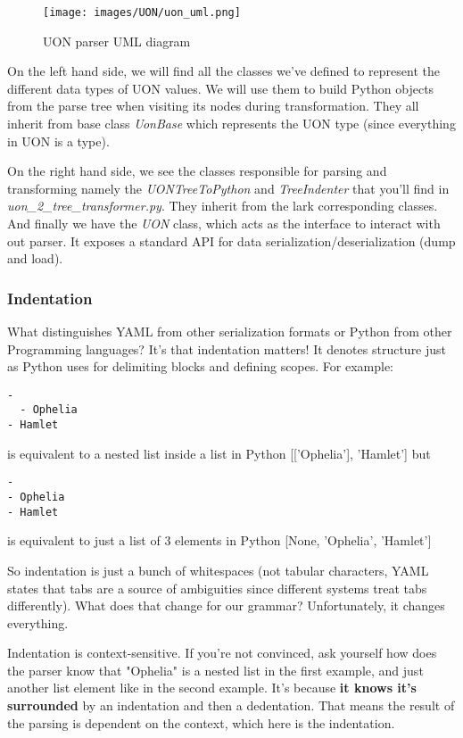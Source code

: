 \documentclass[12pt]{article}
\begin{document}
\begin{figure}[ht!]
 	\centering
 	\caption{UON parser UML diagram}
 	\texttt{[image: images/UON/uon\_uml.png]}
 	\label{fig:uml}
\end{figure}

On the left hand side, we will find all the classes we've defined to represent the different data types of UON values. We will use them to build Python objects from the parse tree when visiting its nodes during transformation. They all inherit from base class \emph{UonBase} which represents the UON type (since everything in UON is a type).

On the right hand side, we see the classes responsible for parsing and transforming namely the \emph{UONTreeToPython} and \emph{TreeIndenter} that you'll find in \\ \emph{uon\_2\_tree\_transformer.py}. They inherit from the lark corresponding classes. And finally we have the \emph{UON} class, which acts as the interface to interact with out parser. It exposes a standard API for data serialization/deserialization (dump and load).

\subsubsection{Indentation}
What distinguishes YAML from other serialization formats or Python from other Programming languages? It's that indentation matters! It denotes structure just as Python uses for delimiting blocks and defining scopes. For example:
\begin{lstlisting}
- 
  - Ophelia
- Hamlet
\end{lstlisting}
is equivalent to a nested list inside a list in Python [['Ophelia'], 'Hamlet']
but 
\begin{lstlisting}
- 
- Ophelia
- Hamlet
\end{lstlisting}
is equivalent to just a list of 3 elements in Python [None, 'Ophelia', 'Hamlet']

So indentation is just a bunch of whitespaces (not tabular characters, YAML states that tabs are a source of ambiguities since different systems treat tabs differently). What does that change for our grammar? Unfortunately, it changes everything.

Indentation is context-sensitive. If you're not convinced, ask yourself how does the parser know that "Ophelia" is a nested list in the first example, and just another list element like in the second example. It's because \textbf{it knows it's surrounded} by an indentation and then a dedentation. That means the result of the parsing is dependent on the context, which here is the indentation.
\end{document}
